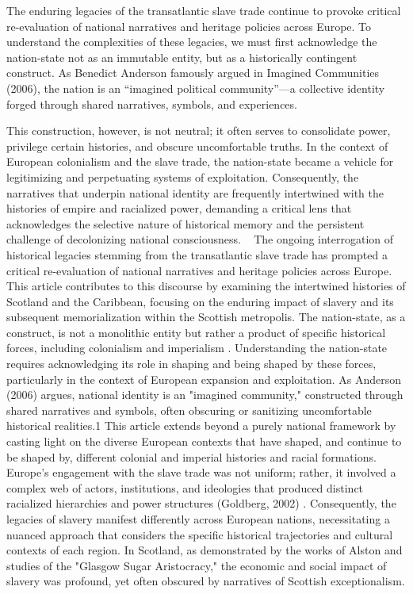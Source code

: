\documentclass{scrartcl}
\begin{document}
The enduring legacies of the transatlantic slave trade continue to provoke critical re-evaluation of national narratives and heritage policies across Europe. To understand the complexities of these legacies, we must first acknowledge the nation-state not as an immutable entity, but as a historically contingent construct. As Benedict Anderson famously argued in Imagined Communities (2006), the nation is an “imagined political community”—a collective identity forged through shared narratives, symbols, and experiences.

This construction, however, is not neutral; it often serves to consolidate power, privilege certain histories, and obscure uncomfortable truths. In the context of European colonialism and the slave trade, the nation-state became a vehicle for legitimizing and perpetuating systems of exploitation. Consequently, the narratives that underpin national identity are frequently intertwined with the histories of empire and racialized power, demanding a critical lens that acknowledges the selective nature of historical memory and the persistent challenge of decolonizing national consciousness.  
The ongoing interrogation of historical legacies stemming from the transatlantic slave trade has prompted a critical re-evaluation of national narratives and heritage policies across Europe. 
This article contributes to this discourse by examining the intertwined histories of Scotland and the Caribbean, focusing on the enduring impact of slavery and its subsequent memorialization within the Scottish metropolis. 
The nation-state, as a construct, is not a monolithic entity but rather a product of specific historical forces, including colonialism and imperialism \cite{godard_2018}.
Understanding the nation-state requires acknowledging its role in shaping and being shaped by these forces, particularly in the context of European expansion and exploitation. 
As Anderson (2006) argues, national identity is an "imagined community," constructed through shared narratives and symbols, often obscuring or sanitizing uncomfortable historical realities.1
This article extends beyond a purely national framework by casting light on the diverse European contexts that have shaped, and continue to be shaped by, different colonial and imperial histories and racial formations.
Europe's engagement with the slave trade was not uniform; rather, it involved a complex web of actors, institutions, and ideologies that produced distinct racialized hierarchies and power structures (Goldberg, 2002) \cite{goldberg_2002}.
Consequently, the legacies of slavery manifest differently across European nations, necessitating a nuanced approach that considers the specific historical trajectories and cultural contexts of each region.
In Scotland, as demonstrated by the works of Alston \cite{alston_2021} and studies of the "Glasgow Sugar Aristocracy," the economic and social impact of slavery was profound, yet often obscured by narratives of Scottish exceptionalism.
\end{document}
